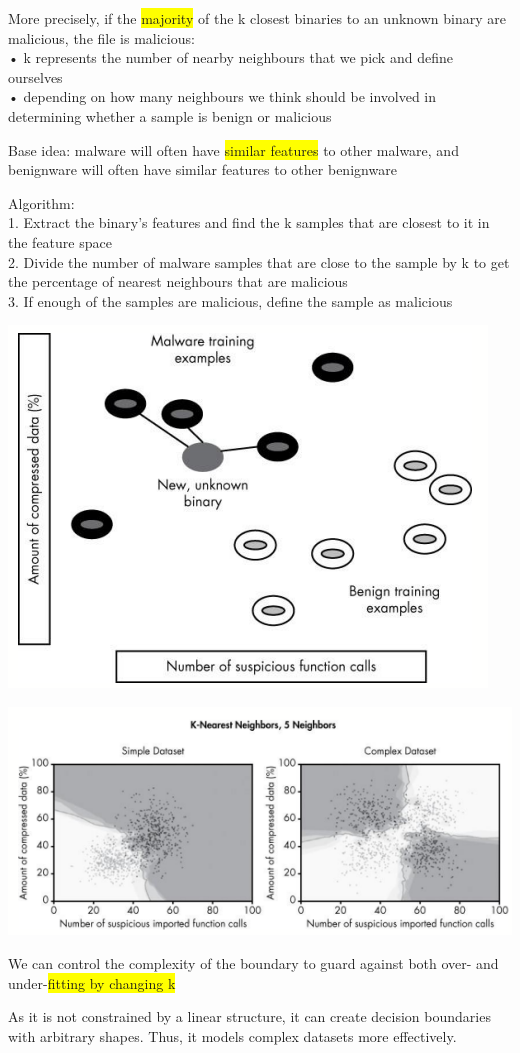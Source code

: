\documentclass[]{project_plan}
\begin{document}
More precisely, if the \colorbox{yellow}{majority} of the k closest binaries to an unknown binary are
malicious, the file is malicious:\\
• k represents the number of nearby neighbours that we pick and define ourselves\\
• depending on how many neighbours we think should be involved in determining whether
a sample is benign or malicious

Base idea: malware will often have \colorbox{yellow}{similar features} to other malware, and
benignware will often have similar features to other benignware

Algorithm:\\
1. Extract the binary’s features and find the k samples that are closest to it in the
feature space\\
2. Divide the number of malware samples that are close to the sample by k to get
the percentage of nearest neighbours that are malicious\\
3. If enough of the samples are malicious, define the sample as malicious

\includegraphics[width=.6\linewidth]{ml66.png}

\includegraphics[width=.8\linewidth]{ml67.png}

We can control the complexity of the boundary to guard against both over- and under-\colorbox{yellow}{fitting by changing k}

As it is not constrained by a linear structure, it can create decision boundaries with arbitrary shapes. Thus, it
models complex datasets more effectively.
\end{document}
